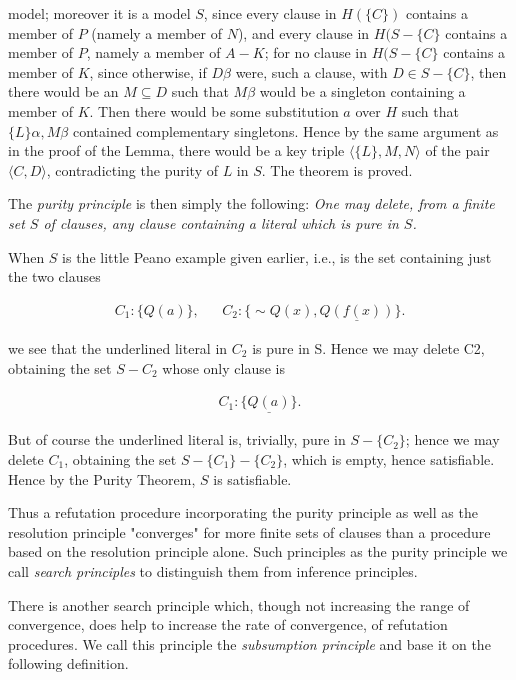 \documentclass[8pt]{extarticle}
\begin{document}
model; moreover it is a model $S$, since every clause in $H(\{C\})$ contains a member of $P$ (namely a member of $N$), and every clause in $H(S - \{C\}$ contains a member of $P$, namely a member of $A - K$; for no clause in $H(S - \{C\}$ contains a member of $K$, since otherwise, if $D\beta$ were, such a clause, with $D \in S - \{C\}$, then there would be an $M\subseteq D$ such that $M\beta$ would be a singleton containing a member of $K$. Then there would be some substitution $a$ over $H$ such that $\{L\}\alpha, M\beta$ contained complementary singletons. Hence by the same argument as in the proof of the Lemma, there would be a key triple $\langle\{L\}, M, N\rangle$ 
of the pair $\langle C,D\rangle$, contradicting the purity of $L$ in $S$. The theorem is proved.

The \emph{purity principle} is then simply the following: \emph{One may delete, from a finite set $S$ of clauses, any clause containing a literal which is pure in $S$.}

When $S$ is the little Peano example given earlier, i.e., is the set containing just the two clauses

\begin{align*}
    C_1 : \{Q(a)\}, && C_2 : \{\sim Q(x), \underline{Q(f(x))}\}.
\end{align*}

we see that the underlined literal in $C_2$ is pure in S. Hence we may delete C2, obtaining the set $S - {C_2}$ whose only clause is

\begin{align*}
    C_1 : \{\underline{Q(a)}\}.
\end{align*}

But of course the underlined literal is, trivially, pure in $S - \{C_2\}$; hence we may delete $C_1$, obtaining the set $S - \{C_1\} - \{C_2\}$, which is empty, hence satisfiable. Hence by the Purity Theorem, $S$ is satisfiable. 

Thus a refutation procedure incorporating the purity principle as well as the resolution principle "converges" for more finite sets of clauses than a procedure based on the resolution principle alone. Such principles as the purity principle we call \emph{search principles} to distinguish them from inference principles.

There is another search principle which, though not increasing the range of convergence, does help to increase the rate of convergence, of refutation procedures. We call this principle the \emph{subsumption principle} and base it on the following definition.
\end{document}
